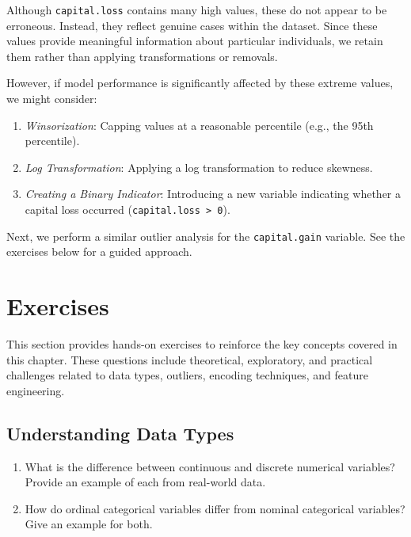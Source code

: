 \documentclass[
]{book}
\newcommand{\passthrough}[1]{#1}
\providecommand{\tightlist}{%
  \setlength{\itemsep}{0pt}\setlength{\parskip}{0pt}}
\theoremstyle{definition}
\theoremstyle{definition}
\theoremstyle{definition}
\theoremstyle{definition}
\theoremstyle{remark}
\begin{document}
Although \passthrough{\lstinline!capital.loss!} contains many high values, these do not appear to be erroneous. Instead, they reflect genuine cases within the dataset. Since these values provide meaningful information about particular individuals, we retain them rather than applying transformations or removals.

However, if model performance is significantly affected by these extreme values, we might consider:

\begin{enumerate}
\def\labelenumi{\arabic{enumi}.}
\tightlist
\item
  \emph{Winsorization}: Capping values at a reasonable percentile (e.g., the 95th percentile).\\
\item
  \emph{Log Transformation}: Applying a log transformation to reduce skewness.\\
\item
  \emph{Creating a Binary Indicator}: Introducing a new variable indicating whether a capital loss occurred (\passthrough{\lstinline!capital.loss > 0!}).
\end{enumerate}

Next, we perform a similar outlier analysis for the \passthrough{\lstinline!capital.gain!} variable. See the exercises below for a guided approach.

\section{Exercises}\label{exercises-2}

This section provides hands-on exercises to reinforce the key concepts covered in this chapter. These questions include theoretical, exploratory, and practical challenges related to data types, outliers, encoding techniques, and feature engineering.

\subsection*{Understanding Data Types}\label{understanding-data-types}

\begin{enumerate}
\def\labelenumi{\arabic{enumi}.}
\tightlist
\item
  What is the difference between continuous and discrete numerical variables? Provide an example of each from real-world data.\\
\item
  How do ordinal categorical variables differ from nominal categorical variables? Give an example for both.
\end{enumerate}
\end{document}
